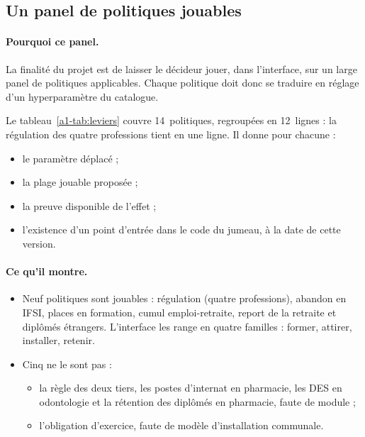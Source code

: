 \subsection{Un panel de politiques jouables}

\paragraph{Pourquoi ce panel.}
La finalité du projet est de laisser le décideur jouer, dans l'interface,
sur un large panel de politiques applicables. Chaque politique doit donc se
traduire en réglage d'un hyperparamètre du catalogue.

Le tableau~\ref{a1-tab:leviers} couvre 14~politiques, regroupées en 12~lignes :
la régulation des quatre professions tient en une ligne. Il donne pour
chacune :
\begin{itemize}
\item le paramètre déplacé ;
\item la plage jouable proposée ;
\item la preuve disponible de l'effet ;
\item l'existence d'un point d'entrée dans le code du jumeau, à la date de
  cette version.
\end{itemize}

\paragraph{Ce qu'il montre.}
\begin{itemize}
\item Neuf politiques sont jouables : régulation (quatre professions),
  abandon en IFSI, places en formation, cumul emploi-retraite, report de la
  retraite et diplômés étrangers. L'interface les range en quatre familles :
  former, attirer, installer, retenir.
\item Cinq ne le sont pas :
  \begin{itemize}
  \item la règle des deux tiers, les postes d'internat en pharmacie, les DES
    en odontologie et la rétention des diplômés en pharmacie, faute de
    module ;
  \item l'obligation d'exercice, faute de modèle d'installation communale.
  \end{itemize}
\end{itemize}

